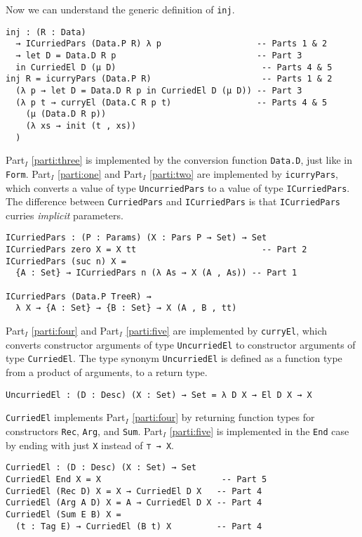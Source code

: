 \documentclass[runningheads,a4paper]{llncs}
\newcommand{\refparti}[1]{Part$_I$ \ref{parti:#1}}
\begin{document}
Now we can understand the generic definition of {\tt inj}.

\begin{verbatim}
inj : (R : Data)
  → ICurriedPars (Data.P R) λ p                   -- Parts 1 & 2
  → let D = Data.D R p                            -- Part 3
  in CurriedEl D (μ D)                             -- Parts 4 & 5
inj R = icurryPars (Data.P R)                      -- Parts 1 & 2
  (λ p → let D = Data.D R p in CurriedEl D (μ D)) -- Part 3
  (λ p t → curryEl (Data.C R p t)                 -- Parts 4 & 5
    (μ (Data.D R p))
    (λ xs → init (t , xs))
  )
\end{verbatim}

\refparti{three} is implemented by the conversion function
{\tt Data.D}, just like in {\tt Form}.
\refparti{one} and \refparti{two} are implemented by
{\tt icurryPars}, which converts a value of type {\tt UncurriedPars} to
a value of type {\tt ICurriedPars}. The difference between {\tt CurriedPars} and
{\tt ICurriedPars} is that {\tt ICurriedPars}
curries {\it implicit} parameters.

\begin{verbatim}
ICurriedPars : (P : Params) (X : Pars P → Set) → Set
ICurriedPars zero X = X tt                         -- Part 2
ICurriedPars (suc n) X =
  {A : Set} → ICurriedPars n (λ As → X (A , As)) -- Part 1

ICurriedPars (Data.P TreeR) ⇝
  λ X → {A : Set} → {B : Set} → X (A , B , tt)
\end{verbatim}

\refparti{four} and \refparti{five} are implemented by
{\tt curryEl}, which converts constructor arguments of type
{\tt UncurriedEl} to constructor arguments of type {\tt CurriedEl}.
The type synonym {\tt UncurriedEl}
is defined as a function type from a product of arguments, to a return
type.

\begin{verbatim}
UncurriedEl : (D : Desc) (X : Set) → Set = λ D X → El D X → X
\end{verbatim}

{\tt CurriedEl} implements \refparti{four} by returning function
types for constructors {\tt Rec}, {\tt Arg}, and {\tt Sum}.
\refparti{five} is implemented in the {\tt End} case by ending with
just {\tt X} instead of {\tt ⊤ → X}.

\begin{verbatim}
CurriedEl : (D : Desc) (X : Set) → Set
CurriedEl End X = X                        -- Part 5     
CurriedEl (Rec D) X = X → CurriedEl D X   -- Part 4
CurriedEl (Arg A D) X = A → CurriedEl D X -- Part 4
CurriedEl (Sum E B) X =
  (t : Tag E) → CurriedEl (B t) X         -- Part 4
\end{verbatim}
\end{document}
